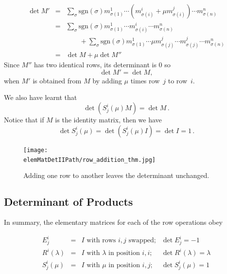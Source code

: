 \begin{eqnarray*}
\det M' & = & \sum_{\sigma} \text{sgn}(\sigma) m^1_{\sigma(1)}\cdots (m^i_{\sigma(i)}+ \mu m^j_{\sigma(i)}) \cdots m^n_{\sigma(n)} \\
& = & \sum_{\sigma} \text{sgn}(\sigma) m^1_{\sigma(1)}\cdots m^i_{\sigma(i)} \cdots m^n_{\sigma(n)} \\
&   & \qquad + \sum_{\sigma} \text{sgn}(\sigma) m^1_{\sigma(1)}\cdots \mu m^j_{\sigma(j)} \cdots m^j_{\sigma(j)} \cdots m^n_{\sigma(n)} \\
& = & \det M + \mu \det M''
\end{eqnarray*}
Since $M''$ has two identical rows, its determinant is $0$ so
\[
\det M' = \det M,
\]
when $M'$ is obtained from $M$ by adding $\mu$ times row~$j$ to row~$i$.


\noindent
We also have learnt that
\[\det \left( S^i_j(\mu)M \right) = \det M\, .\]
Notice that if $M$ is the identity matrix, then we have \[\det S^i_j(\mu) = \det (S^i_j(\mu)I) = \det I = 1\, .\]



\begin{figure}
\begin{center}
\texttt{[image: \\elemMatDetIIPath/row\_addition\_thm.jpg]}
\end{center}
\caption{Adding one row to another leaves the determinant unchanged.}
\end{figure}

\subsection{Determinant of Products}
In summary, the elementary matrices for each of the row operations obey

\[
\begin{array}{cccc}
E^i_j &=& I \text{ with rows $i,j$ swapped;} &\det E^i_j=-1 \\[3mm]
R^i(\lambda) &=& I \text{ with $\lambda$ in position $i,i$;} 
	&\det R^i(\lambda)=\lambda \\[3mm]
S^i_j(\mu) &=& I \text{ with $\mu$ in position $i,j$;} 
	&\det S^i_j(\mu)=1 \\[3mm]
\end{array}
\]

